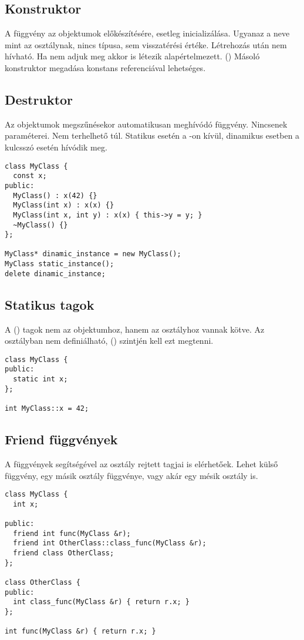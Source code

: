 \documentclass[../../main.tex]{subfiles}
\begin{document}
\subsection{Konstruktor}

A  függvény az objektumok előkészítésére, esetleg
inicializálása. Ugyanaz a neve mint az osztálynak, nincs típusa, sem
visszatérési értéke. Létrehozás után nem hívható. Ha nem adjuk meg akkor
is létezik alapértelmezett. () Másoló konstruktor megadása
konstans referenciával lehetséges.

\subsection{Destruktor}

Az objektumok megszűnésekor automatikusan meghívódó függvény.
Nincsenek paraméterei. Nem terhelhető túl. Statikus  esetén a
-on kívül, dinamikus esetben a  kulcsszó esetén
hívódik meg.

\begin{verbatim}
class MyClass {
  const x;
public:
  MyClass() : x(42) {}
  MyClass(int x) : x(x) {}
  MyClass(int x, int y) : x(x) { this->y = y; }
  ~MyClass() {}
};

MyClass* dinamic_instance = new MyClass();
MyClass static_instance();
delete dinamic_instance;
\end{verbatim}

\subsection{Statikus tagok}

A  () tagok nem az objektumhoz, hanem az osztályhoz
vannak kötve. Az osztályban nem definiálható,  ()
szintjén kell ezt megtenni.

\begin{verbatim}
class MyClass {
public:
  static int x;
};

int MyClass::x = 42;
\end{verbatim}

\subsection{Friend függvények}

A  függvények segítségével az osztály rejtett tagjai is elérhetőek.
Lehet külső függvény, egy másik osztály függvénye, vagy akár egy mésik osztály
is.

\begin{verbatim}
class MyClass {
  int x;

public:
  friend int func(MyClass &r);
  friend int OtherClass::class_func(MyClass &r);
  friend class OtherClass;
};

class OtherClass {
public:
  int class_func(MyClass &r) { return r.x; }
};

int func(MyClass &r) { return r.x; }
\end{verbatim}
\end{document}
